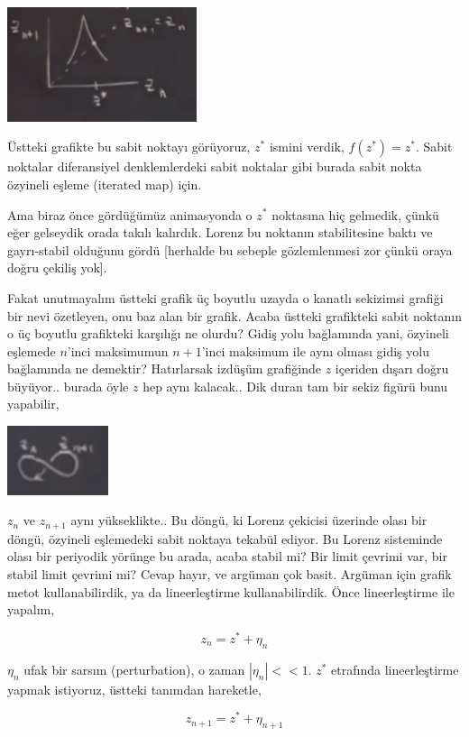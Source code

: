 \documentclass[12pt,fleqn]{article}\usepackage{../../common}
\begin{document}
\includegraphics[width=15em]{18_09.png}

Üstteki grafikte bu sabit noktayı görüyoruz, $z^*$ ismini verdik, $f(z^*) =
z^*$. Sabit noktalar diferansiyel denklemlerdeki sabit noktalar gibi burada
sabit nokta özyineli eşleme (iterated map) için. 

Ama biraz önce gördüğümüz animasyonda o $z^*$ noktasına hiç gelmedik, çünkü
eğer gelseydik orada takılı kalırdık. Lorenz bu noktanın stabilitesine
baktı ve gayrı-stabil olduğunu gördü [herhalde bu sebeple gözlemlenmesi zor
çünkü oraya doğru çekiliş yok].

Fakat unutmayalım üstteki grafik üç boyutlu uzayda o kanatlı sekizimsi
grafiği bir nevi özetleyen, onu baz alan bir grafik. Acaba üstteki
grafikteki sabit noktanın o üç boyutlu grafikteki karşılığı ne olurdu?
Gidiş yolu bağlamında yani, özyineli eşlemede $n$'inci maksimumun
$n+1$'inci maksimum ile aynı olması gidiş yolu bağlamında ne demektir?
Hatırlarsak izdüşüm grafiğinde $z$ içeriden dışarı doğru büyüyor.. burada
öyle $z$ hep aynı kalacak.. Dik duran tam bir sekiz figürü bunu yapabilir,

\includegraphics[width=8em]{18_10.png}

$z_n$ ve $z_{n+1}$ aynı yükseklikte.. Bu döngü, ki Lorenz çekicisi üzerinde
olası bir döngü, özyineli eşlemedeki sabit noktaya tekabül ediyor. Bu
Lorenz sisteminde olası bir periyodik yörünge bu arada, acaba stabil mi?
Bir limit çevrimi var, bir stabil limit çevrimi mi? Cevap hayır, ve argüman
çok basit. Argüman için grafik metot kullanabilirdik, ya da lineerleştirme
kullanabilirdik. Önce lineerleştirme ile yapalım,

$$ z_n = z^* + \eta_n$$ 

$\eta_n$ ufak bir sarsım (perturbation), o zaman $|\eta_n| << 1$. $z^*$
etrafında lineerleştirme yapmak istiyoruz, üstteki tanımdan hareketle,

$$ z_{n+1} =  z^* + \eta_{n+1} $$
\end{document}
